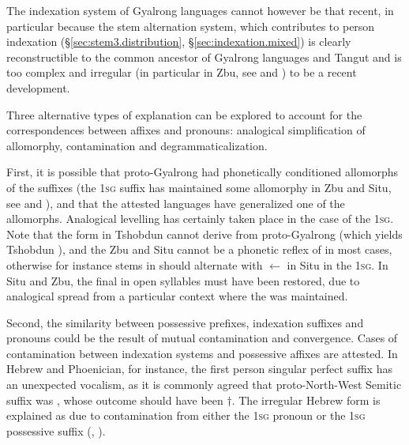 The indexation system of Gyalrong languages cannot however be that recent, in particular because the stem alternation system, which contributes to person indexation (§\ref{sec:stem3.distribution}, §\ref{sec:indexation.mixed}) is clearly reconstructible to the common ancestor of Gyalrong languages and Tangut \citep{gong16stems} and is too complex and irregular (in particular in Zbu, see \citealt{jackson04showu} and \citealt{gong18these}) to be a recent development.

Three alternative types of explanation can be explored to account for the correspondences between affixes and pronouns: analogical simplification of allomorphy, contamination and degrammaticalization.

First, it is possible that proto-Gyalrong had phonetically conditioned allomorphs of the suffixes (the \textsc{1sg} suffix has maintained some allomorphy in Zbu and Situ, see \citealt[46]{gongxun14agreement} and \citealt[198]{linxr93jiarong}), and that the attested languages have generalized one of the allomorphs.  Analogical levelling has certainly taken place in the case of the \textsc{1sg}. Note that the form  in Tshobdun  cannot derive from proto-Gyalrong  (which yields Tshobdun ), and the Zbu and Situ  cannot be a phonetic reflex of  in most cases, otherwise for instance stems in  should alternate with  $\leftarrow$  in Situ in the \textsc{1sg}.  In Situ and Zbu, the final  in open syllables must have been restored, due to analogical spread from a particular context where the  was maintained.

Second, the similarity between possessive prefixes, indexation suffixes and pronouns could be the result of mutual contamination and convergence. Cases of contamination between indexation systems and possessive affixes are attested. In Hebrew and Phoenician, for instance, the first person singular perfect suffix  has an unexpected vocalism, as it is commonly agreed that proto-North-West Semitic suffix was , whose outcome should have been $\dagger$. The irregular Hebrew form is explained as due to contamination from either the \textsc{1sg} pronoun  or the \textsc{1sg} possessive suffix  (\citealt[122-123;132-133]{jouon06}, \citealt[227--229]{suchard16vowels}).  

